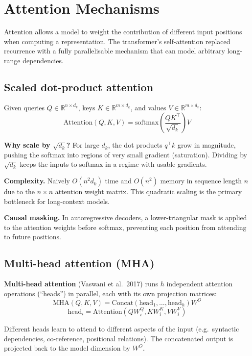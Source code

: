 
\section{Attention Mechanisms}

Attention allows a model to weight the contribution of different input positions when
computing a representation. The transformer's self-attention replaced recurrence with
a fully parallelisable mechanism that can model arbitrary long-range dependencies.

\subsection{Scaled dot-product attention}

Given queries $Q \in \mathbb{R}^{n \times d_k}$, keys $K \in \mathbb{R}^{m \times d_k}$,
and values $V \in \mathbb{R}^{m \times d_v}$:
\[
  \text{Attention}(Q, K, V) = \text{softmax}\!\left(\frac{QK^\top}{\sqrt{d_k}}\right) V
\]

\textbf{Why scale by $\sqrt{d_k}$?} For large $d_k$, the dot products $q^\top k$ grow
in magnitude, pushing the softmax into regions of very small gradient (saturation).
Dividing by $\sqrt{d_k}$ keeps the inputs to softmax in a regime with usable gradients.

\textbf{Complexity.} Naively $O(n^2 d_k)$ time and $O(n^2)$ memory in sequence length $n$
due to the $n \times n$ attention weight matrix. This quadratic scaling is the primary
bottleneck for long-context models.

\textbf{Causal masking.} In autoregressive decoders, a lower-triangular mask is applied
to the attention weights before softmax, preventing each position from attending to
future positions.

\subsection{Multi-head attention (MHA)}

\textbf{Multi-head attention} (Vaswani et al.\ 2017) runs $h$ independent attention
operations (``heads'') in parallel, each with its own projection matrices:
\[
  \text{MHA}(Q, K, V) = \text{Concat}(\text{head}_1, \ldots, \text{head}_h) W^O
\]
\[
  \text{head}_i = \text{Attention}(Q W_i^Q, K W_i^K, V W_i^V)
\]

Different heads learn to attend to different aspects of the input (e.g.\ syntactic
dependencies, co-reference, positional relations). The concatenated output is projected
back to the model dimension by $W^O$.

